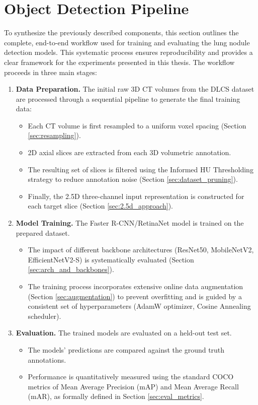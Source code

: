 \section{Object Detection Pipeline}
To synthesize the previously described components, this section outlines the complete, end-to-end workflow used for training and evaluating the lung nodule detection models. This systematic process ensures reproducibility and provides a clear framework for the experiments presented in this thesis. The workflow proceeds in three main stages:

\begin{enumerate}
    \item \textbf{Data Preparation.} The initial raw 3D CT volumes from the DLCS dataset are processed through a sequential pipeline to generate the final training data:
    \begin{itemize}
        \item Each CT volume is first resampled to a uniform voxel spacing (Section \ref{sec:resampling}).
        \item 2D axial slices are extracted from each 3D volumetric annotation.
        \item The resulting set of slices is filtered using the Informed HU Thresholding strategy to reduce annotation noise (Section \ref{sec:dataset_pruning}).
        \item Finally, the 2.5D three-channel input representation is constructed for each target slice (Section \ref{sec:2.5d_approach}).
    \end{itemize}

    \item \textbf{Model Training.} The Faster R-CNN/RetinaNet model is trained on the prepared dataset. 
    \begin{itemize}
        \item The impact of different backbone architectures (ResNet50, MobileNetV2, EfficientNetV2-S) is systematically evaluated (Section \ref{sec:arch_and_backbones}).
        \item The training process incorporates extensive online data augmentation (Section \ref{sec:augmentation}) to prevent overfitting and is guided by a consistent set of hyperparameters (AdamW optimizer, Cosine Annealing scheduler).
    \end{itemize}

    \item \textbf{Evaluation.} The trained models are evaluated on a held-out test set. 
    \begin{itemize}
        \item The models' predictions are compared against the ground truth annotations.
        \item Performance is quantitatively measured using the standard COCO metrics of Mean Average Precision (mAP) and Mean Average Recall (mAR), as formally defined in Section \ref{sec:eval_metrics}.
    \end{itemize}
\end{enumerate}



